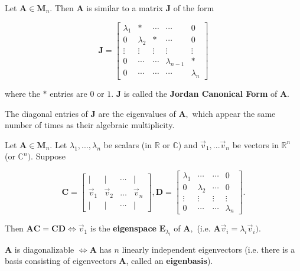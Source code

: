 \documentclass{article}
\begin{document}
\begin{theorem}
Let $\boldsymbol{A} \in \boldsymbol{M}_n.$ Then $\boldsymbol{A}$ is similar to a matrix $\boldsymbol{J}$ of the form 

\[
\boldsymbol{J} = \begin{bmatrix}
   \lambda_{1} & \ast & \cdots & \cdots & 0\\
    0 & \lambda_{2} & \ast & \cdots & 0 \\
    \vdots & \vdots & \vdots & \vdots & \vdots \\
    0 & \cdots & \cdots & \lambda_{n-1} & \ast \\
    0 & \cdots & \cdots & \cdots & \lambda_{n}
  \end{bmatrix}
\]

\centerline{where the $\ast$ entries are $0$ or $1$. $\boldsymbol{J}$ is called the \textbf{Jordan Canonical Form} of $\boldsymbol{A}$.}
The diagonal entries of $\boldsymbol{J}$ are the eigenvalues of $\boldsymbol{A},$ which appear the same number of times as their algebraic multiplicity.
\end{theorem}

\begin{lemma}
Let $\boldsymbol{A} \in \boldsymbol{M}_{n}.$ Let $\lambda_{1} , ...,  \lambda_{n}$ be scalars (in $\mathbb{R}$ or $\mathbb{C}$) and $\vec{v}_1, ... \vec{v}_n$ be vectors in $\mathbb{R}^n$ (or $\mathbb{C}^n).$ Suppose 

\[
\boldsymbol{C} = \begin{bmatrix}
    | & | & \cdots & | \\
    \vec{v}_1 & \vec{v}_2 & \dots & \vec{v}_n \\
    | & | & \cdots & |  
  \end{bmatrix},
\boldsymbol{D} = \begin{bmatrix}
   \lambda_{1} & \cdots & \cdots & 0\\
    0 & \lambda_{2} & \cdots & 0 \\
    \vdots & \vdots & \vdots & \vdots \\
    0 & \cdots & \cdots & \lambda_{n}
\end{bmatrix}.
\] 

Then $\boldsymbol{AC} = \boldsymbol{CD} \iff \vec{v}_1$ is the \textbf{eigenspace} $\boldsymbol{E}_{\lambda_{i}}$ of $\boldsymbol{A},$ (i.e. $\boldsymbol{A}\vec{v}_{i} = \lambda_{i}\vec{v}_i)$.
\end{lemma}

\begin{theorem}
$\boldsymbol{A}$ is diagonalizable $\iff \boldsymbol{A}$ has $n$ linearly independent eigenvectors (i.e. there is a basis consisting of eigenvectors $\boldsymbol{A}$, called an \textbf{eigenbasis}).
\end{theorem}
\end{document}
